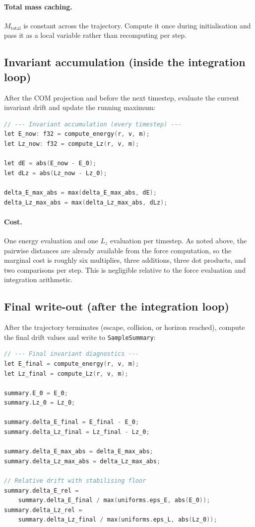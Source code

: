 \documentclass[11pt]{article}
\newcommand{\struct}[1]{\texttt{#1}}
\begin{document}
\paragraph{Total mass caching.} $M_{\text{total}}$ is constant across the
trajectory. Compute it once during initialisation and pass it as a local
variable rather than recomputing per step.

\subsection{Invariant accumulation (inside the integration loop)}

After the COM projection and before the next timestep, evaluate the current
invariant drift and update the running maximum:

\begin{lstlisting}[language=C]
// --- Invariant accumulation (every timestep) ---
let E_now: f32 = compute_energy(r, v, m);
let Lz_now: f32 = compute_Lz(r, v, m);

let dE = abs(E_now - E_0);
let dLz = abs(Lz_now - Lz_0);

delta_E_max_abs = max(delta_E_max_abs, dE);
delta_Lz_max_abs = max(delta_Lz_max_abs, dLz);
\end{lstlisting}

\paragraph{Cost.} One energy evaluation and one $L_z$ evaluation per timestep.
As noted above, the pairwise distances are already available from the force
computation, so the marginal cost is roughly six multiplies, three additions,
three dot products, and two comparisons per step. This is negligible relative
to the force evaluation and integration arithmetic.

\subsection{Final write-out (after the integration loop)}

After the trajectory terminates (escape, collision, or horizon reached),
compute the final drift values and write to \struct{SampleSummary}:

\begin{lstlisting}[language=C]
// --- Final invariant diagnostics ---
let E_final = compute_energy(r, v, m);
let Lz_final = compute_Lz(r, v, m);

summary.E_0 = E_0;
summary.Lz_0 = Lz_0;

summary.delta_E_final = E_final - E_0;
summary.delta_Lz_final = Lz_final - Lz_0;

summary.delta_E_max_abs = delta_E_max_abs;
summary.delta_Lz_max_abs = delta_Lz_max_abs;

// Relative drift with stabilising floor
summary.delta_E_rel =
    summary.delta_E_final / max(uniforms.eps_E, abs(E_0));
summary.delta_Lz_rel =
    summary.delta_Lz_final / max(uniforms.eps_L, abs(Lz_0));
\end{lstlisting}
\end{document}
